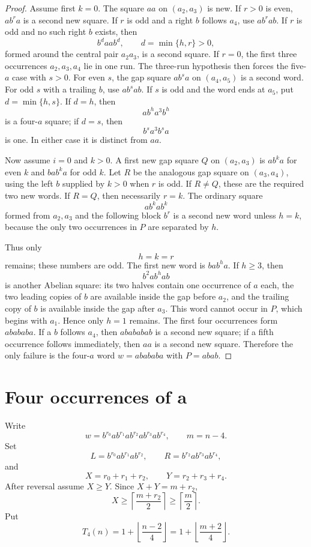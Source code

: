 \documentclass[11pt]{article}
\theoremstyle{definition}
\begin{document}
\begin{proof}
Assume first $k=0$. The square $aa$ on $(a_2,a_3)$ is new. If $r>0$ is even, $ab^r a$ is a second new square. If $r$ is odd and a right $b$ follows $a_4$, use $ab^r ab$. If $r$ is odd and no such right $b$ exists, then
\[
 b^d aa b^d,\qquad d=\min\{h,r\}>0,
\]
formed around the central pair $a_2a_3$, is a second square. If $r=0$, the first three occurrences $a_2,a_3,a_4$ lie in one run. The three-run hypothesis then forces the five-$a$ case with $s>0$. For even $s$, the gap square $ab^s a$ on $(a_4,a_5)$ is a second word. For odd $s$ with a trailing $b$, use $ab^s ab$. If $s$ is odd and the word ends at $a_5$, put $d=\min\{h,s\}$. If $d=h$, then
\[
 ab^h a^3b^h
\]
is a four-$a$ square; if $d=s$, then
\[
 b^s a^3b^s a
\]
is one. In either case it is distinct from $aa$.

Now assume $i=0$ and $k>0$. A first new gap square $Q$ on $(a_2,a_3)$ is $ab^k a$ for even $k$ and $bab^k a$ for odd $k$. Let $R$ be the analogous gap square on $(a_3,a_4)$, using the left $b$ supplied by $k>0$ when $r$ is odd. If $R\ne Q$, these are the required two new words. If $R=Q$, then necessarily $r=k$. The ordinary square
\[
 ab^k ab^k
\]
formed from $a_2,a_3$ and the following block $b^r$ is a second new word unless $h=k$, because the only two occurrences in $P$ are separated by $h$.

Thus only
\[
 h=k=r
\]
remains; these numbers are odd. The first new word is $bab^h a$. If $h\ge3$, then
\[
 b^2ab^h ab
\]
is another Abelian square: its two halves contain one occurrence of $a$ each, the two leading copies of $b$ are available inside the gap before $a_2$, and the trailing copy of $b$ is available inside the gap after $a_3$. This word cannot occur in $P$, which begins with $a_1$. Hence only $h=1$ remains. The first four occurrences form $abababa$. If a $b$ follows $a_4$, then $abababab$ is a second new square; if a fifth occurrence follows immediately, then $aa$ is a second new square. Therefore the only failure is the four-$a$ word $w=abababa$ with $P=abab$.
\end{proof}

\section{Four occurrences of a}

Write
\begin{equation}\label{eq:x4-gaps}
 w=b^{r_0}a b^{r_1}a b^{r_2}a b^{r_3}a b^{r_4},
 \qquad m=n-4.
\end{equation}
Set
\[
 L=b^{r_0}a b^{r_1}a b^{r_2},
 \qquad
 R=b^{r_2}a b^{r_3}a b^{r_4},
\]
and
\[
 X=r_0+r_1+r_2,\qquad Y=r_2+r_3+r_4.
\]
After reversal assume $X\ge Y$. Since $X+Y=m+r_2$,
\begin{equation}\label{eq:x4-long-wing}
 X\ge\left\lceil\frac{m+r_2}{2}\right\rceil\ge\left\lceil\frac m2\right\rceil.
\end{equation}
Put
\[
 T_4(n)=1+\left\lfloor\frac{n-2}{4}\right\rfloor
       =1+\left\lfloor\frac{m+2}{4}\right\rfloor.
\]
\end{document}

